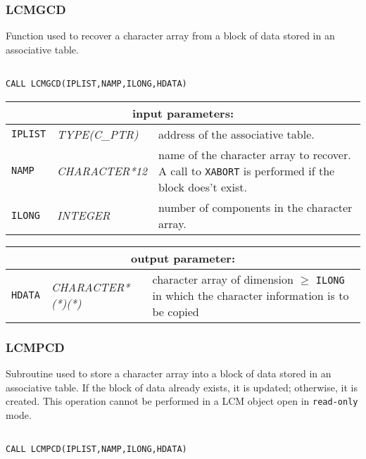 \subsubsection{LCMGCD}\label{sect:LCMGCD}

Function used to recover a character array from a block of data stored in an associative table.

\begin{verbatim}

CALL LCMGCD(IPLIST,NAMP,ILONG,HDATA)
\end{verbatim}

\noindent
\begin{tabular}{|p{1.5cm}|p{3cm}|p{10cm}|}
\hline
\multicolumn{3}{|c|}{\bf input parameters:} \\
\hline
{\tt IPLIST} & {\it TYPE(C\_PTR)} & address of the associative table. \\
\hline
{\tt NAMP} & {\it CHARACTER*12} &  name of the character array
to recover. A call to {\tt XABORT} is performed if the block does't exist. \\
\hline
{\tt ILONG} & {\it INTEGER} & number of components in the character array.\\
\hline
\end{tabular}

\vskip 0.8cm

\noindent
\begin{tabular}{|p{1.5cm}|p{3.5cm}|p{9.5cm}|}
\hline
\multicolumn{3}{|c|}{\bf output parameter:} \\
\hline
{\tt HDATA} & {\it CHARACTER*(*)(*)} & character array of dimension $\ge$ {\tt ILONG} in which the character information is to be copied \\
\hline
\end{tabular}

\subsubsection{LCMPCD}\label{sect:LCMPCD}

Subroutine used to store a character array into a block of data stored in an associative table.
If the block of data already exists, it is updated; otherwise, it is created. This operation cannot be performed
in a LCM object open in {\tt read-only} mode.

\begin{verbatim}

CALL LCMPCD(IPLIST,NAMP,ILONG,HDATA)
\end{verbatim}

